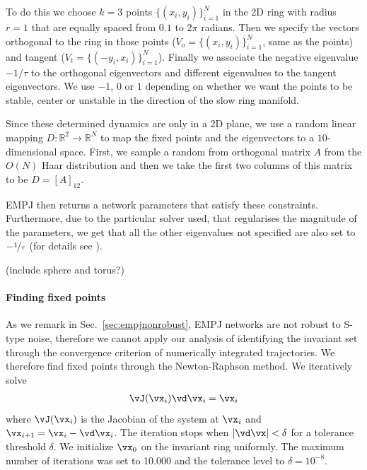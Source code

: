 \documentclass{article} %
\newcommand{\ascomment}[1]{\textcolor{ascolor}{(#1)}}
\newcounter{ct}
\newcommand{\reals}{\mathbb{R}}
\theoremstyle{definition}
\theoremstyle{remark}
\begin{document}
To do this we choose $k=3$ points $\{(x_i, y_i)\}_{i=1}^N$ in the 2D ring with radius $r=1$ that are equally spaced from $0.1$ to $2 \pi$ radians. Then we specify the vectors orthogonal to the ring in those points ($V_o = \{(x_i, y_i)\}_{i=1}^N$, same as the points) and tangent ($V_t = \{(-y_i, x_i)\}_{i=1}^N$).
Finally we associate the negative eigenvalue $-1/\tau$ to the orthogonal eigenvectors and different eigenvalues to the tangent eigenvectors. We use $-1$, $0$ or $1$ depending on whether we want the points to be stable, center or unstable in the direction of the slow ring manifold.

Since these determined dynamics are only in a 2D plane, we use a random linear mapping $D\colon\reals^2\rightarrow\reals^N$ to map the fixed points and the eigenvectors to a $10$-dimensional space. First, we sample a random from orthogonal matrix $A$ from the $O(N)$ Haar distribution and then we take the first two columns of this matrix to be $D=[A]_{12}$.

EMPJ then returns a network parameters that satisfy these constraints. Furthermore, due to the particular solver used, that regularises the magnitude of the parameters, we get that all the other eigenvalues not specified are also set to $-\nicefrac{1}{\tau}$ (for details see \citep{pollock2020}).


\ascomment{include sphere and torus?}
\citep{hermansen2024uncovering}

\paragraph{Finding fixed points}
As we remark in Sec.~\ref{sec:empjnonrobust}, EMPJ networks are not robust to S-type noise, therefore we cannot apply our analysis of identifying the invariant set through the convergence criterion of numerically integrated trajectories.
We therefore find fixed points through the Newton-Raphson method.
We iteratively solve
\begin{align}
 \vJ(\vx_i)\vd\vx_i = \vx_i
\end{align}
where \(\vJ(\vx_i)\) is the Jacobian of the system at \(\vx_i\) and \(\vx_{i+1}=\vx_i-\vd\vx_i\).
The iteration stops when $|\vd\vx|<\delta$ for a tolerance threshold $\delta$.
We initialize \(\vx_0\) on the invariant ring uniformly.
The maximum number of iterations was set to 10.000 and the tolerance level to $\delta=10^{-8}$.
\end{document}
